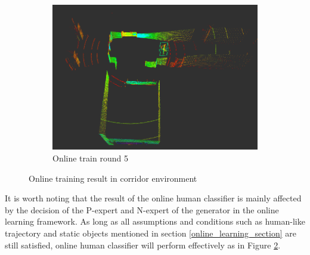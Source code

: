 \begin{figure}[!htb]
\begin{subfigure}{1\linewidth}
        \includegraphics[scale=0.35]{figures/chap3_fig/onlineSVM/online_train_round5.png}
        \caption{Online train round 5}
        \label{Chap4:Fig23:sub3}
    \end{subfigure}
    \caption{Online training result in corridor environment}
    \label{Chap4:Fig23}
\end{figure}




It is worth noting that the result of the online human classifier is mainly affected by the decision of 
the P-expert and N-expert of the generator in the online learning framework. As long as all assumptions and conditions such as 
human-like trajectory and static objects mentioned in section \ref{online_learning_section} are still satisfied, online human classifier
will perform effectively as in Figure \ref{Chap4:Fig23}.

